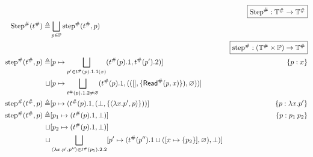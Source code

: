 \documentclass{article}
\begin{document}
\begin{align*}
                                     &                                                                                                                                          & \fbox{$\Abs\Step:\Abs{\mathbb{T}}\rightarrow\Abs{\mathbb{T}}$}                   \\
  \Abs\Step(\Abs\ptree)   \triangleq & \bigsqcup_{p\in\mathbb{P}}\Abs\step(\Abs\ptree,p)                                                                                                                                                                           \\
                                     &                                                                                                                                          & \fbox{$\Abs\step:(\Abs{\mathbb{T}}\times\mathbb{P})\rightarrow\Abs{\mathbb{T}}$} \\
  \Abs\step(\Abs\ptree,p) \triangleq & [p\mapsto\bigsqcup_{p'\in\Abs\ptree(p).1.1(x)}(\Abs\ptree(p).1,\Abs\ptree(p').2)]                                                        & \plabel{p}{x}                                                                    \\
  \sqcup                             & [p\mapsto\bigsqcup_{\Abs\ptree(p).1.2\neq\varnothing}(\Abs\ptree(p).1,(([],\{\Abs\ReadE(p,x)\}),\varnothing))]                                                                                                              \\
  \Abs\step(\Abs\ptree,p) \triangleq & [p\mapsto(\Abs\ptree(p).1,(\bot,\{\langle\lambda x.p',p\rangle\}))]                                                                      & \plabel{p}{\lambda x.p'}                                                         \\
  \Abs\step(\Abs\ptree,p) \triangleq & [p_1\mapsto(\Abs\ptree(p).1,\bot)]                                                                                                       & \plabel{p}{p_1\:p_2}                                                             \\
  \sqcup                             & [p_2\mapsto(\Abs\ptree(p).1,\bot)]                                                                                                                                                                                          \\
  \sqcup                             & \bigsqcup_{\langle\lambda x.p',p''\rangle\in\Abs\ptree(p_1).2.2}[p'\mapsto(\Abs\ptree(p'').1\sqcup([x\mapsto\{p_2\}],\varnothing),\bot)]                                                                                    \\

\end{align*}
\end{document}
